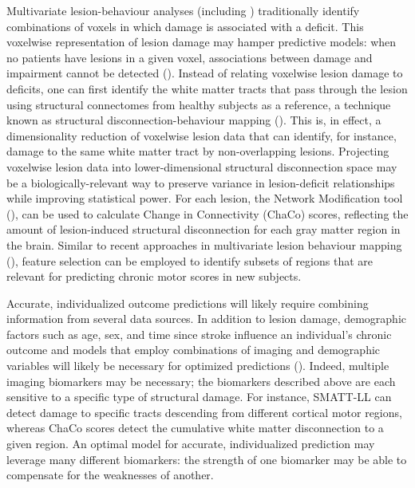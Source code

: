 \documentclass[phd,tocprelim]{cornell}
\begin{document}
Multivariate lesion-behaviour analyses (including \cite{Bowren2022-rs}) traditionally identify combinations of voxels in which damage is associated with a deficit. This voxelwise representation of lesion damage may hamper predictive models: when no patients have lesions in a given voxel, associations between damage and impairment cannot be detected (\cite{Kimberg2007-sk, Rorden2009-ae,Sperber2020-kp,Griffis2019-cy}). Instead of relating voxelwise lesion damage to deficits, one can first identify the white matter tracts that pass through the lesion using structural connectomes from healthy subjects as a reference, a technique known as structural disconnection-behaviour mapping (\cite{Kuceyeski2013-nk, Kuceyeski2016-vj, Salvalaggio2020-pe, Griffis2019-cy, Sperber2022-oj}). This is, in effect, a dimensionality reduction of voxelwise lesion data that can identify, for instance, damage to the same white matter tract by non-overlapping lesions. Projecting voxelwise lesion data into lower-dimensional structural disconnection space may be a biologically-relevant way to preserve variance in lesion-deficit relationships while improving statistical power. For each lesion, the Network Modification tool (\cite{Kuceyeski2013-nk}),  can be used to calculate Change in Connectivity (ChaCo) scores, reflecting the amount of lesion-induced structural disconnection for each gray matter region in the brain.  Similar to recent approaches in multivariate lesion behaviour mapping (\cite{Kasties2021-rm}), feature selection can be employed to identify subsets of regions that are relevant for predicting chronic motor scores in new subjects. 

Accurate, individualized outcome predictions will likely require combining information from several data sources. In addition to lesion damage, demographic factors such as age, sex, and time since stroke influence an individual's chronic outcome and models that employ combinations of imaging and demographic variables will likely be necessary for optimized predictions (\cite{Bonkhoff2022-op}). Indeed, multiple imaging biomarkers may be necessary; the biomarkers described above are each sensitive to a specific type of structural damage. For instance,  SMATT-LL can detect damage to specific tracts descending from different cortical motor regions, whereas ChaCo scores detect the cumulative white matter disconnection to a given region. An optimal model for accurate, individualized prediction may leverage many different biomarkers: the strength of one biomarker may be able to compensate for the weaknesses of another. 
\end{document}
